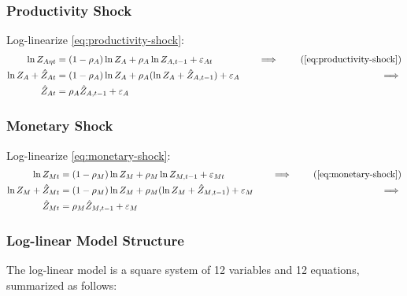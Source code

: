 \documentclass[
	12pt,
	]{article}
\numberwithin{equation}{section}
\theoremstyle{definition}
\theoremstyle{plain}
\theoremstyle{plain}
\theoremstyle{plain}
\begin{document}

\subsubsection{Productivity Shock}

Log-linearize \ref{eq:productivity-shock}:
\begin{alignat}{2}
	\ln{Z_{A\eta t}} &= (1-\rho_A)\ln{Z_A} + \rho_A\ln{Z_{A,t-1}} + \varepsilon_{At} &\implies \tag{\ref{eq:productivity-shock}} \\
	\ln{Z_{A}} + \hat{Z}_{At} &= (1-\rho_A) \ln{Z_A} + \rho_A (\ln{Z_{A}} + \hat{Z}_{A,t-1}) + \varepsilon_{A} \quad &\implies \nonumber \\
	\hat{Z}_{At} &= \rho_A \hat{Z}_{A,t-1} + \varepsilon_{A} \label{eq:ll-productivity-shock}
\end{alignat}


\subsubsection{Monetary Shock}

Log-linearize \ref{eq:monetary-shock}:
\begin{alignat}{2}
	\ln{Z_{Mt}} &= (1-\rho_M)\ln{Z_M} + \rho_M\ln{Z_{M,t-1}} + \varepsilon_{Mt} &\implies \tag{\ref{eq:monetary-shock}} \\
	\ln{Z_{M}} + \hat{Z}_{Mt} &= (1-\rho_M) \ln{Z_M} + \rho_M (\ln{Z_{M}} + \hat{Z}_{M,t-1}) + \varepsilon_{M} \quad &\implies \nonumber \\
	\hat{Z}_{Mt} &= \rho_M \hat{Z}_{M,t-1} + \varepsilon_{M} \label{eq:ll-monetary-shock}
\end{alignat}



\subsubsection{Log-linear Model Structure}

The log-linear model is a square system of 12 variables and 12 equations, summarized as follows:
\end{document}
